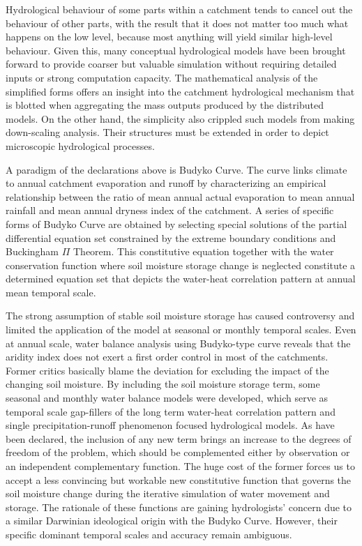 \documentclass[draft,wrr]{AGUTeX}
\begin{document}
\begin{article}
Hydrological behaviour of some parts within a catchment tends to cancel out the behaviour of other parts, with the result that it does not matter too much what happens on the low level, because most anything will yield similar high-level behaviour\citep{hofstadter1980godel}. Given this, many conceptual hydrological models have been brought forward to provide  coarser but valuable simulation without requiring detailed inputs or strong computation capacity. The mathematical analysis of the simplified forms offers an insight into the catchment hydrological mechanism that is blotted when aggregating the mass outputs produced by the distributed models\citep{gerrits2009analytical,xu2014attribution}. On the other hand, the simplicity also crippled such models from making down-scaling analysis. Their structures must be extended in order to depict microscopic hydrological processes.
 
A paradigm of the declarations above is Budyko Curve\citep{budyko1961heat}. The curve links climate to annual catchment evaporation and runoff by characterizing an empirical relationship between the ratio of mean annual actual evaporation to mean annual rainfall and mean annual dryness index of the catchment\citep{wang2012responses}. A series of specific forms of Budyko Curve are obtained by selecting special solutions of the partial differential equation set constrained  by the extreme boundary conditions and Buckingham $\Pi$ Theorem\citep{FuBaopu,choudhury1999evaluation,yang2008new}. This constitutive equation together with the water conservation function where soil moisture storage change is neglected constitute a determined equation set that depicts the water-heat correlation pattern at annual mean temporal scale\citep{zhang2001response,yang2007analyzing}. 

The strong assumption of stable soil moisture storage has caused controversy and limited the application of the model at seasonal or monthly temporal scales. Even at annual scale, water balance analysis using Budyko-type curve reveals that the aridity index does not exert a first order control in most of the catchments\citep{tekleab2011water}. Former critics basically blame the deviation for excluding the impact of the changing soil moisture\citep{sankarasubramanian2002annual,sankarasubramanian2003hydroclimatology}. By including the soil moisture storage term, some seasonal and monthly water balance models were developed\citep{abcd,xiong1999two,zhang2008water}, which serve as  temporal scale gap-fillers of the long term water-heat correlation pattern and single precipitation-runoff phenomenon focused hydrological models. As have been declared, the inclusion of any new term brings an increase to the degrees of freedom of the problem, which should be complemented either by observation or an independent complementary function. The huge cost of the former forces us to accept a less convincing but workable new constitutive function that governs the soil moisture change during the iterative simulation of water movement and storage. The rationale of these functions are gaining hydrologists' concern due to a similar Darwinian ideological origin with the Budyko Curve\citep{wang2014one}. However, their specific dominant temporal scales and accuracy remain ambiguous. 


\end{article}
\end{document}
